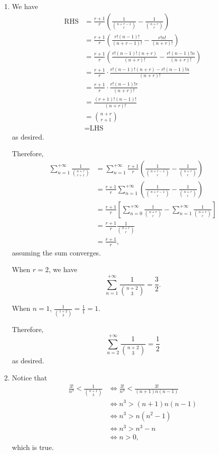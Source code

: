 \Question{\currfilebase}

\begin{enumerate}
    \item We have
    \begin{align*}
        \text{RHS} &= \frac{r+1}{r} \left(\frac{1}{\binom{n+r-1}{r}} - \frac{1}{\binom{n+r}{r}}\right)\\
        &= \frac{r+1}{r} \left(\frac{r! (n-1)!}{(n+r-1)!} - \frac{r! n!}{(n+r)!}\right)\\
        &= \frac{r+1}{r} \left(\frac{r! (n-1)! (n+r)}{(n+r)!} - \frac{r! (n-1)! n}{(n+r)!}\right)\\
        &= \frac{r+1}{r} \cdot \frac{r! (n-1)! (n+r) - r! (n-1)! n}{(n+r)!}\\
        &= \frac{r+1}{r} \cdot \frac{r! (n-1)! r}{(n+r)!}\\
        &= \frac{(r+1)! (n-1)! }{(n+r)!}\\
        &= \binom{n+r}{r+1}\\
        &= \text{LHS}
    \end{align*}
    as desired.

    Therefore,
    \begin{align*}
        \sum_{n = 1}^{+\infty} \frac{1}{\binom{n+r}{r+1}} &= \sum_{n = 1}^{+\infty} \frac{r+1}{r} \left(\frac{1}{\binom{n+r-1}{r}} - \frac{1}{\binom{n+r}{r}}\right)\\
        &= \frac{r+1}{r} \sum_{n = 1}^{+\infty} \left(\frac{1}{\binom{n+r-1}{r}} - \frac{1}{\binom{n+r}{r}}\right)\\
        &= \frac{r+1}{r} \left[\sum_{n = 0}^{+\infty} \frac{1}{\binom{n + r}{r}} - \sum_{n = 1}^{+\infty} \frac{1}{\binom{n + r}{r}}\right]\\
        &= \frac{r+1}{r} \frac{1}{\binom{0+r}{r}}\\
        &= \frac{r+1}{r},
    \end{align*}
    assuming the sum converges.

    When \(r = 2\), we have
    \[
        \sum_{n = 1}^{+\infty} \frac{1}{\binom{n+2}{3}} = \frac{3}{2}.
    \]

    When \(n = 1\), \(\frac{1}{\binom{1 + 2}{3}} = \frac{1}{1} = 1\).

    Therefore,
    \[
        \sum_{n = 2}^{+\infty} \frac{1}{\binom{n+2}{3}} = \frac{1}{2}
    \]
    as desired.

    \item Notice that
    \begin{align*}
        \frac{3!}{n^3} < \frac{1}{\binom{n+1}{3}} &\iff \frac{3!}{n^3} < \frac{3!}{(n+1)n(n-1)}\\
        &\iff n^3 > (n+1)n(n-1)\\
        &\iff n^3 > n(n^2 - 1)\\
        &\iff n^3 > n^3 - n\\
        &\iff n > 0,
    \end{align*}
    which is true.


\end{enumerate}
